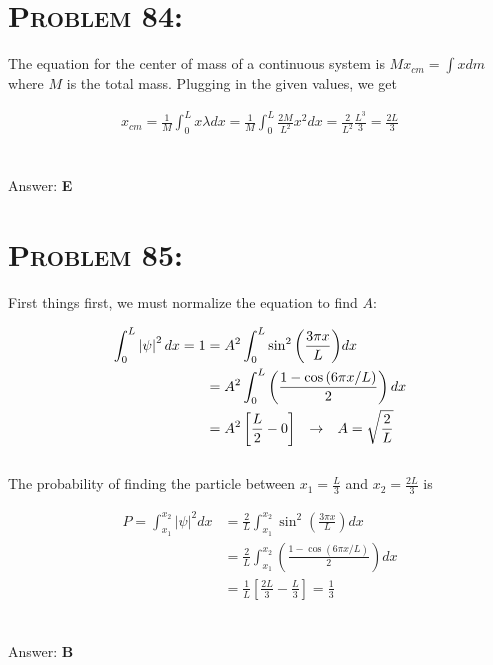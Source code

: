 \documentclass{article}
\begin{document}

\section{\textsc{Problem 84:}} The equation for the center of mass of a continuous system is $M x_{cm} = \int x dm$ where $M$ is the total mass. Plugging in the given values, we get

\begin{gather}
x_{cm} = \frac{1}{M} \int_{0}^{L} x \lambda dx = \frac{1}{M} \int_{0}^{L}  \frac{2 M}{L^{2}} x^{2} dx = \frac{2}{L^{2}} \frac{L^{3}}{3} = \boxed{\frac{2 L}{3}}\nonumber
\end{gather}
\\\\
Answer: \textbf{\textcolor{ProcessBlue}E}\\


\section{\textsc{Problem 85:}} First things first, we must normalize the equation to find $A$:

\begin{align}
\int^{L}_{0} \left| \psi \right|^{2} dx = 1 &= A^{2} \int^{L}_{0} \sin^{2}{\left(\frac{3 \pi x}{L}\right)} dx\nonumber\\
&=  A^{2} \int^{L}_{0} \left( \frac{1 - \cos{\left(6 \pi x/L \right)}}{2}\right) dx \nonumber\\
&=  A^{2} \left[\frac{L}{2} - 0 \right] \hspace{.1in} \rightarrow \hspace{.1in} A = \sqrt{\frac{2}{L}} \nonumber
\end{align}
\\
The probability of finding the particle between $x_{1} = \frac{L}{3}$ and $x_{2} = \frac{2L}{3}$ is

\begin{align}
P = \int^{x_{2}}_{x_{1}} \left| \psi \right|^{2} dx &= \frac{2}{L} \int^{x_{2}}_{x_{1}} \sin^{2}{\left(\frac{3 \pi x}{L}\right)} dx\nonumber\\
&= \frac{2}{L} \int^{x_{2}}_{x_{1}}  \left( \frac{1 - \cos{\left(6 \pi x/L \right)}}{2}\right) dx  \nonumber\\
&= \frac{1}{L} \left[   \frac{2L}{3} - \frac{L}{3}  \right] = \boxed{\frac{1}{3}}\nonumber
\end{align}
\\\\
Answer: \textbf{\textcolor{ProcessBlue}B}\\
\end{document}
